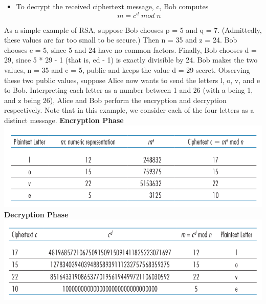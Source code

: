 \documentclass{report}
\begin{document}
{{{{{\begin{itemize}
\item{To decrypt the received ciphertext message, c, Bob computes
$$m=c^d\;mod\;n$$}
\end{itemize}

As a simple example of RSA, suppose Bob chooses p = 5 and q = 7. (Admittedly,
these values are far too small to be secure.) Then n = 35 and z = 24. Bob chooses
e = 5, since 5 and 24 have no common factors. Finally, Bob chooses d = 29, since
5 * 29 - 1 (that is, ed - 1) is exactly divisible by 24. Bob makes the two values, n = 35
and e = 5, public and keeps the value d = 29 secret. Observing these two public
values, suppose Alice now wants to send the letters l, o, v, and e to Bob. Interpreting
each letter as a number between 1 and 26 (with a being 1, and z being 26), Alice and
Bob perform the encryption and decryption respectively.
Note that in this example, we consider each of the four letters as a distinct message.\newline
\newline
\bf{Encryption Phase}\newline
\includegraphics[scale=0.5]{Rsatab}\newline
\bf{Decryption Phase}\newline
\includegraphics[scale=.5]{drcp}\newline
}\newpage
}}}}
\end{document}
